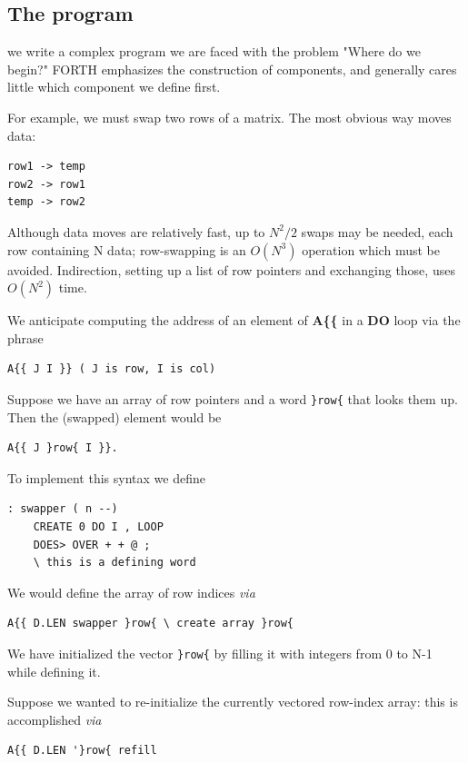 \subsection{The program}
 we write a complex program we are faced with the problem "Where do we begin?" FORTH emphasizes the construction of components, and generally cares little which component we define first.

For example, we must swap two rows of a matrix. The most
obvious way moves data:

\begin{verbatim}
row1 -> temp
row2 -> row1
temp -> row2
\end{verbatim}

Although data moves are relatively fast, up to $N^2/2$ swaps may be needed, each row containing N data; row-swapping is an $O(N^3)$ operation which must be avoided. Indirection, setting up a list of row pointers and exchanging those, uses $O(N^2)$ time.


We anticipate computing the address of an element of \textbf{A\{\{} in a
\textbf{DO} loop via the phrase 
\begin{verbatim}
A{{ J I }} ( J is row, I is col)
\end{verbatim}

Suppose we have an array of row pointers and a word \verb|}row{| that looks them up. Then the (swapped) element would be
\begin{verbatim}
A{{ J }row{ I }}.
\end{verbatim}

To implement this syntax we define
\begin{verbatim}
: swapper ( n --)
    CREATE 0 DO I , LOOP
    DOES> OVER + + @ ;
    \ this is a defining word
\end{verbatim}
 
We would define the array of row indices \textit{via}

\begin{verbatim}
A{{ D.LEN swapper }row{ \ create array }row{
\end{verbatim}

We have initialized the vector \verb|}row{| by filling it with integers
from 0 to N-1 while defining it.

Suppose we wanted to re-initialize the currently vectored row-index array: this is accomplished \textit{via}

\begin{verbatim}
A{{ D.LEN '}row{ refill 
\end{verbatim}

